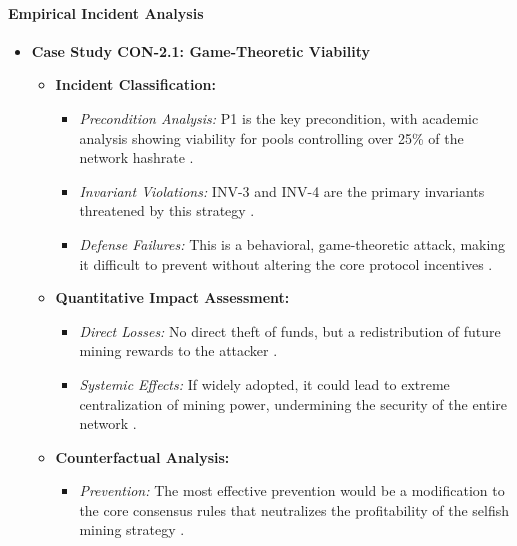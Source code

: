 \paragraph{Empirical Incident Analysis}

\begin{itemize}
    \item \textbf{Case Study CON-2.1: Game-Theoretic Viability}
    \begin{itemize}
        \item \textbf{Incident Classification:}
            \begin{itemize}
                \item \textit{Precondition Analysis:} P1 is the key precondition, with academic analysis showing viability for pools controlling over 25\% of the network hashrate \cite{eyal2014}.
                \item \textit{Invariant Violations:} INV-3 and INV-4 are the primary invariants threatened by this strategy \cite{eyal2014}.
                \item \textit{Defense Failures:} This is a behavioral, game-theoretic attack, making it difficult to prevent without altering the core protocol incentives \cite{eyal2014, wang2019}.
            \end{itemize}
        \item \textbf{Quantitative Impact Assessment:}
            \begin{itemize}
                \item \textit{Direct Losses:} No direct theft of funds, but a redistribution of future mining rewards to the attacker \cite{eyal2014}.
                \item \textit{Systemic Effects:} If widely adopted, it could lead to extreme centralization of mining power, undermining the security of the entire network \cite{eyal2014, wang2019}.
            \end{itemize}
        \item \textbf{Counterfactual Analysis:}
            \begin{itemize}
                \item \textit{Prevention:} The most effective prevention would be a modification to the core consensus rules that neutralizes the profitability of the selfish mining strategy \cite{eyal2014}.
            \end{itemize}
    \end{itemize}
\end{itemize}

